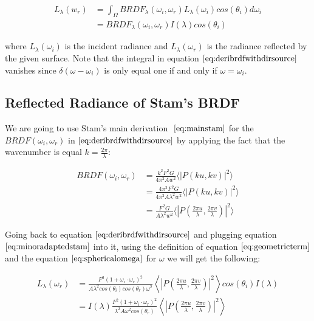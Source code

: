 \begin{align}
L_{\lambda}(w_r) 
& = \int_{\Omega} BRDF_{\lambda}(\omega_i, \omega_r) L_{\lambda}(\omega_i) cos(\theta_i) d\omega_i \nonumber \\
& = BRDF_{\lambda}(\omega_i, \omega_r) I(\lambda) cos(\theta_i)
\label{eq:deribrdfwithdirsource}
\end{align}

where $L_{\lambda}(\omega_i)$ is the incident radiance and $L_{\lambda}(\omega_r)$ is the radiance reflected by the given surface. Note that the integral in equation $\ref{eq:deribrdfwithdirsource}$ vanishes since $\delta(\omega-\omega_i)$ is only equal one if and only if $\omega = \omega_i$.

\subsection{Reflected Radiance of Stam's BRDF}
We are going to use Stam's main derivation $~\eqref{eq:mainstam}$ for the $BRDF(\omega_i, \omega_r)$ in $\ref{eq:deribrdfwithdirsource}$ by applying the fact that the wavenumber is equal $k=\frac{2\pi}{\lambda}$:

\begin{align}
BRDF(\omega_i, \omega_r) 
& = \frac{k^2 F^2 G}{4\pi^2 A w^2} \langle \left|P(ku, kv) \right|^2\rangle \nonumber\\
& = \frac{4 \pi^2 F^2 G}{4\pi^2 A \lambda^2 w^2} \langle \left|P(ku, kv)  \right|^2\rangle \nonumber\\
& = \frac{F^2 G}{A \lambda^2 w^2} \langle \left|P(\frac{2\pi u}{\lambda}, \frac{2\pi v}{\lambda})  \right|^2\rangle
\label{eq:minoradaptedstam}
\end{align}

Going back to equation $\ref{eq:deribrdfwithdirsource}$ and plugging equation $\ref{eq:minoradaptedstam}$ into it, using the definition of equation $\ref{eq:geometricterm}$ and the equation $\ref{eq:sphericalomega}$ for $\omega$ we will get the following:

\begin{align}
L_{\lambda}(\omega_r) 
& = \frac{F^2 (1 + \omega_i \cdot \omega_r)^2}{A \lambda^2 cos(\theta_i)cos(\theta_r)  \omega^2} \left \langle \left|P \left( \frac{2\pi u}{\lambda}, \frac{2\pi v}{\lambda}\right) \right|^2 \right \rangle cos(\theta_i) I(\lambda) \nonumber \\
& = I(\lambda) \frac{F^2 (1 + \omega_i \cdot \omega_r)^2}{\lambda^2 A \omega^2 cos(\theta_r)} \left \langle \left|P \left( \frac{2\pi u}{\lambda}, \frac{2\pi v}{\lambda}\right) \right|^2 \right \rangle
\label{eq:nonrelativebrdffinding}
\end{align}

